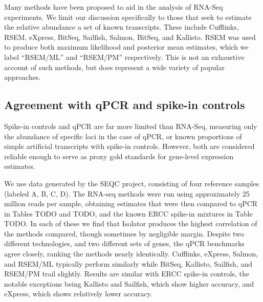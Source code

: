 \documentclass[twocolumn]{article}
\begin{document}
Many methods have been proposed to aid in the analysis of RNA-Seq
experiments. We limit our discussion specifically to those that seek to
estimate the relative abundance a set of known transcripts. These
include Cufflinks, RSEM, eXpress, BitSeq, Sailfish, Salmon, BitSeq, and
Kallisto. RSEM was used to produce both maximum likelihood and posterior
mean estimates, which we label ``RSEM/ML'' and ``RSEM/PM'' respectively.
This is not an exhaustive account of such methods, but does represent a
wide variety of popular approaches.

\subsection{Agreement with qPCR and spike-in
controls}\label{agreement-with-qpcr-and-spike-in-controls}

Spike-in controls and qPCR are far more limited than RNA-Seq, measuring
only the abundance of specific loci in the case of qPCR, or known
proportions of simple artificial transcripts with spike-in controls.
However, both are considered reliable enough to serve as proxy gold
standards for gene-level expression estimates.

We use data generated by the SEQC project, consisting of four reference
samples (labeled A, B, C, D). The RNA-seq methods were run using
approximately 25 million reads per sample, obtaining estimates that were
then compared to qPCR in Tables TODO and TODO, and the known ERCC
spike-in mixtures in Table TODO. In each of these we find that Isolator
produces the highest correlation of the methods compared, though
sometimes by negligible margin. Despite two different technologies, and
two different sets of genes, the qPCR benchmarks agree closely, ranking
the methods nearly identically. Cufflinks, eXpress, Salmon, and RSEM/ML
typically perform similarly while BitSeq, Kallisto, Sailfish, and
RSEM/PM trail slightly. Results are similar with ERCC spike-in controls,
the notable exceptions being Kallisto and Sailfish, which show higher
accuracy, and eXpress, which shows relatively lower accuracy.
\end{document}
